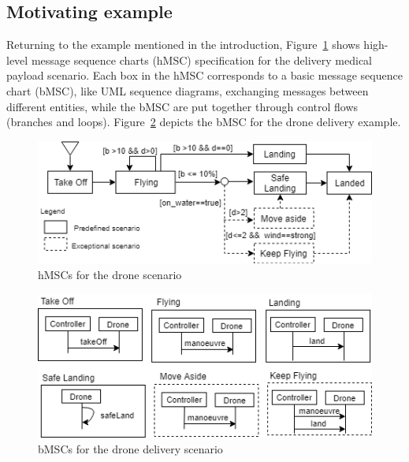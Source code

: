 


\subsection{Motivating example}

Returning to the example mentioned in the introduction, Figure~\ref{fig:drone_msc} shows high-level message sequence charts (hMSC) specification for the delivery medical payload scenario. Each box in the hMSC corresponds to a basic message sequence chart (bMSC), like UML sequence diagrams, exchanging messages between different entities, while the bMSC are put together through control flows (branches and loops). Figure~\ref{fig:drone_bmsc} depicts the bMSC for the drone delivery example.   

\begin{figure}
    \includegraphics[scale=0.55]{figures/new_drone_msc.png}
    \caption{hMSCs for the drone scenario}
    \label{fig:drone_msc}
\end{figure}

\begin{figure}
    \includegraphics[scale=0.5]{figures/new_drone_bmsc.png}
    \caption{bMSCs for the drone delivery scenario}
    \label{fig:drone_bmsc}
\end{figure}

